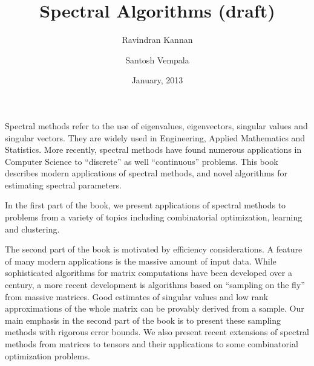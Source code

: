 \documentclass{book}
\numberwithin{exercise}{chapter}
\begin{document}
\frontmatter
\title{\LARGE\bf Spectral Algorithms (draft)}

\author{
Ravindran Kannan
\and
Santosh Vempala
}

\date{January, 2013}

\maketitle

Spectral methods refer to the use of eigenvalues, eigenvectors, singular values and singular vectors.
They are widely used in Engineering, Applied Mathematics and Statistics. More recently,
spectral methods have found numerous applications in Computer Science to ``discrete'' as well
``continuous'' problems.
This book describes modern applications of spectral methods,
and novel algorithms for estimating spectral parameters.

In the first part of the book, we present applications of spectral
methods to problems from a variety of topics including combinatorial optimization,
learning and clustering.

The second part of the book is motivated by efficiency considerations.
A feature of many modern applications is the massive amount of input data. While sophisticated algorithms for matrix computations have been developed over
a century, a more recent development
is algorithms based on ``sampling on the fly'' from massive matrices. Good estimates of singular values and low rank approximations of the whole matrix can be provably derived from
a sample. Our main emphasis in the second part of the book is to present these sampling methods
with rigorous error bounds. We also present recent extensions of spectral
methods from matrices to tensors and their applications to some combinatorial optimization
problems.


\tableofcontents

\end{document}
